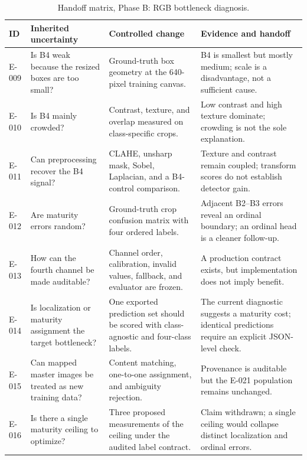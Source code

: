 \begin{table}[t]
\centering\footnotesize
\caption{Handoff matrix, Phase B: RGB bottleneck diagnosis.}
\begin{tabularx}{\textwidth}{L{0.07\textwidth}L{0.24\textwidth}Y Y}
\toprule
\textbf{ID} & \textbf{Inherited uncertainty} & \textbf{Controlled change} & \textbf{Evidence and handoff}\\
\midrule
E-009 & Is B4 weak because the resized boxes are too small? & Ground-truth box geometry at the 640-pixel training canvas. & B4 is smallest but mostly medium; scale is a disadvantage, not a sufficient cause.\\
E-010 & Is B4 mainly crowded? & Contrast, texture, and overlap measured on class-specific crops. & Low contrast and high texture dominate; crowding is not the sole explanation.\\
E-011 & Can preprocessing recover the B4 signal? & CLAHE, unsharp mask, Sobel, Laplacian, and a B4-control comparison. & Texture and contrast remain coupled; transform scores do not establish detector gain.\\
E-012 & Are maturity errors random? & Ground-truth crop confusion matrix with four ordered labels. & Adjacent B2--B3 errors reveal an ordinal boundary; an ordinal head is a cleaner follow-up.\\
E-013 & How can the fourth channel be made auditable? & Channel order, calibration, invalid values, fallback, and evaluator are frozen. & A production contract exists, but implementation does not imply benefit.\\
E-014 & Is localization or maturity assignment the target bottleneck? & One exported prediction set should be scored with class-agnostic and four-class labels. & The current diagnostic suggests a maturity cost; identical predictions require an explicit JSON-level check.\\
E-015 & Can mapped master images be treated as new training data? & Content matching, one-to-one assignment, and ambiguity rejection. & Provenance is auditable but the E-021 population remains unchanged.\\
E-016 & Is there a single maturity ceiling to optimize? & Three proposed measurements of the ceiling under the audited label contract. & Claim withdrawn; a single ceiling would collapse distinct localization and ordinal errors.\\
\bottomrule
\end{tabularx}
\end{table}

